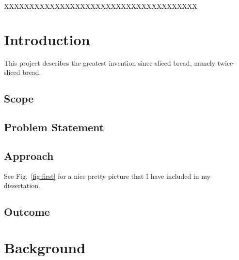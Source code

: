\documentclass[twocolumn,11pt]{report}
\begin{document}
\noindent XXXXXXXXXXXXXXXXXXXXXXXXXXXXXXXXXXXXXX


\newpage



\tableofcontents



\listoffigures


\listoftables



\newpage




\twocolumn
\chapter{Introduction}\label{chap:intro}
 
This project describes the greatest invention since sliced bread, 
namely twice-sliced bread.  


\section{Scope}

\section{Problem Statement}\label{sec:problem}

\section{Approach}

See Fig.~\ref{fig:first} for a nice pretty picture that I have included
in my dissertation.  


\section {Outcome}




\chapter{Background}\label{chap:background}
\end{document}
